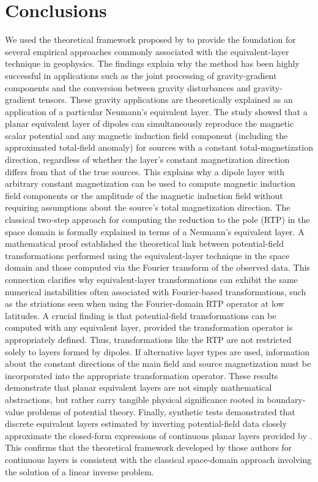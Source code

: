 \section{Conclusions}
\label{sec:conclusions}

We used the theoretical framework proposed by \cite{oliveirajr_etal2026_1}
to provide the foundation for several empirical approaches 
commonly associated with the equivalent-layer technique in geophysics. 
The findings explain why the method has been highly successful in applications such as 
the joint processing of gravity-gradient components and the conversion between gravity 
disturbances and gravity-gradient tensors. These gravity applications are theoretically 
explained as an application of a particular Neumann's equivalent layer.
The study showed that a planar equivalent layer of dipoles can simultaneously reproduce 
the magnetic scalar potential and any magnetic induction field component (including the 
approximated total-field anomaly) for sources with a constant total-magnetization 
direction, regardless of whether the layer's constant magnetization direction 
differs from that of the true sources. This explains why a dipole layer with arbitrary 
constant magnetization can be used to compute magnetic induction field components or 
the amplitude of the magnetic induction field without requiring assumptions about the 
source's total magnetization direction.
The classical two-step approach for computing the reduction to 
the pole (RTP) in the space domain is formally explained in terms of a Neumann’s 
equivalent layer.
A mathematical proof established the theoretical link between potential-field 
transformations performed using the equivalent-layer technique in the space domain and 
those computed via the Fourier transform of the observed data. This connection 
clarifies why equivalent-layer transformations can exhibit the same numerical 
instabilities often associated with Fourier-based transformations, such as the 
striations seen when using the Fourier-domain RTP operator at low latitudes.
A crucial finding is that potential-field transformations can be computed with any 
equivalent layer, provided the transformation operator is appropriately defined. Thus, 
transformations like the RTP are not restricted solely to layers formed by dipoles. If 
alternative layer types are used, information about the constant directions of the main 
field and source magnetization must be incorporated into the appropriate transformation 
operator.
These results demonstrate that planar equivalent layers are not simply mathematical 
abstractions, but rather carry tangible physical significance rooted in 
boundary-value problems of potential theory.
Finally, synthetic tests demonstrated that discrete equivalent layers estimated by inverting 
potential-field data closely approximate the closed-form expressions of continuous 
planar layers provided by \cite{oliveirajr_etal2026_1}. This confirms that the 
theoretical framework developed by those authors for continuous 
layers is consistent with the classical space-domain approach involving the solution of 
a linear inverse problem.
